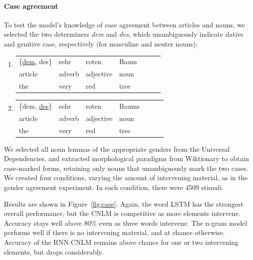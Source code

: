 \paragraph{Case agreement}
To test the model's knowledge of case agreement between articles and
nouns, we selected the two determiners \emph{dem} and \emph{des},
which unambiguously indicate dative and genitive case, respectively
(for masculine and neuter nouns): %
\begin{enumerate}[label={(\arabic*)}]
	\item \begin{tabular}[t]{lllllll}
	\{\underline{dem}, des\}& sehr& roten& Baum \\
	article & adverb & adjective & noun \\
	the & very & red & tree
\end{tabular}
\item \begin{tabular}[t]{lllllll}
	\{dem, \underline{des}\}& sehr& roten& Baums \\
	article & adverb & adjective & noun \\
	the & very & red & tree
\end{tabular}

\end{enumerate}


We selected all noun lemmas of the
appropriate genders from the Universal Dependencies, and extracted
morphological paradigms from Wiktionary to obtain case-marked forms,
retaining only nouns that unambiguously mark the two cases.  We created
four conditions, varying the amount of intervening material, as in the
gender agreement experiment.
In each condition, there were 4509 stimuli.

Results are shown in Figure~\ref{fig:case}.  Again, the word LSTM has
the strongest overall performance, but the CNLM is competitive as more
elements intervene. Accuracy stays well above 80\% even as three
words intervene.  The n-gram model performs well if there is no
intervening material, and at chance otherwise.  Accuracy of the RNN
CNLM remains above chance for one or two intervening elements, but
drops considerably.

